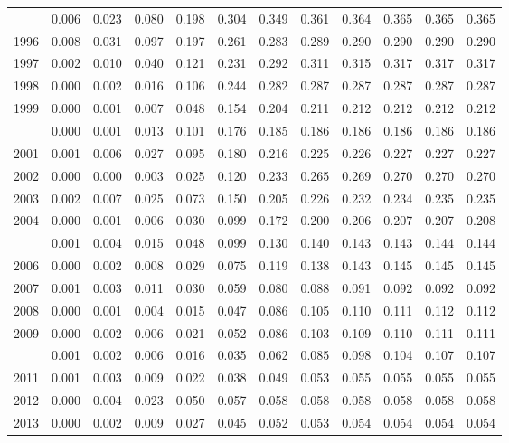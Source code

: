 \documentclass[
]{article}
\begin{document}
\begin{longtable}[t]{lrrrrrrrrrrr}
\addlinespace
1995 & 0.006 & 0.023 & 0.080 & 0.198 & 0.304 & 0.349 & 0.361 & 0.364 & 0.365 & 0.365 & 0.365\\
1996 & 0.008 & 0.031 & 0.097 & 0.197 & 0.261 & 0.283 & 0.289 & 0.290 & 0.290 & 0.290 & 0.290\\
1997 & 0.002 & 0.010 & 0.040 & 0.121 & 0.231 & 0.292 & 0.311 & 0.315 & 0.317 & 0.317 & 0.317\\
1998 & 0.000 & 0.002 & 0.016 & 0.106 & 0.244 & 0.282 & 0.287 & 0.287 & 0.287 & 0.287 & 0.287\\
1999 & 0.000 & 0.001 & 0.007 & 0.048 & 0.154 & 0.204 & 0.211 & 0.212 & 0.212 & 0.212 & 0.212\\
\addlinespace
2000 & 0.000 & 0.001 & 0.013 & 0.101 & 0.176 & 0.185 & 0.186 & 0.186 & 0.186 & 0.186 & 0.186\\
2001 & 0.001 & 0.006 & 0.027 & 0.095 & 0.180 & 0.216 & 0.225 & 0.226 & 0.227 & 0.227 & 0.227\\
2002 & 0.000 & 0.000 & 0.003 & 0.025 & 0.120 & 0.233 & 0.265 & 0.269 & 0.270 & 0.270 & 0.270\\
2003 & 0.002 & 0.007 & 0.025 & 0.073 & 0.150 & 0.205 & 0.226 & 0.232 & 0.234 & 0.235 & 0.235\\
2004 & 0.000 & 0.001 & 0.006 & 0.030 & 0.099 & 0.172 & 0.200 & 0.206 & 0.207 & 0.207 & 0.208\\
\addlinespace
2005 & 0.001 & 0.004 & 0.015 & 0.048 & 0.099 & 0.130 & 0.140 & 0.143 & 0.143 & 0.144 & 0.144\\
2006 & 0.000 & 0.002 & 0.008 & 0.029 & 0.075 & 0.119 & 0.138 & 0.143 & 0.145 & 0.145 & 0.145\\
2007 & 0.001 & 0.003 & 0.011 & 0.030 & 0.059 & 0.080 & 0.088 & 0.091 & 0.092 & 0.092 & 0.092\\
2008 & 0.000 & 0.001 & 0.004 & 0.015 & 0.047 & 0.086 & 0.105 & 0.110 & 0.111 & 0.112 & 0.112\\
2009 & 0.000 & 0.002 & 0.006 & 0.021 & 0.052 & 0.086 & 0.103 & 0.109 & 0.110 & 0.111 & 0.111\\
\addlinespace
2010 & 0.001 & 0.002 & 0.006 & 0.016 & 0.035 & 0.062 & 0.085 & 0.098 & 0.104 & 0.107 & 0.107\\
2011 & 0.001 & 0.003 & 0.009 & 0.022 & 0.038 & 0.049 & 0.053 & 0.055 & 0.055 & 0.055 & 0.055\\
2012 & 0.000 & 0.004 & 0.023 & 0.050 & 0.057 & 0.058 & 0.058 & 0.058 & 0.058 & 0.058 & 0.058\\
2013 & 0.000 & 0.002 & 0.009 & 0.027 & 0.045 & 0.052 & 0.053 & 0.054 & 0.054 & 0.054 & 0.054\\

\end{longtable}
\end{document}
